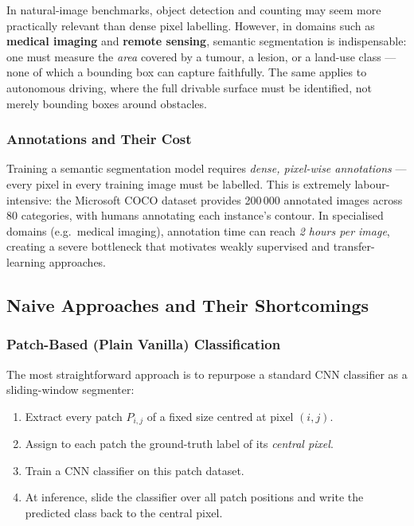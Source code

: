 \documentclass[11pt,a4paper]{article}
\begin{document}
In natural-image benchmarks, object detection and counting may seem more practically relevant than dense pixel labelling. However, in domains such as \textbf{medical imaging} and \textbf{remote sensing}, semantic segmentation is indispensable: one must measure the \emph{area} covered by a tumour, a lesion, or a land-use class — none of which a bounding box can capture faithfully. The same applies to autonomous driving, where the full drivable surface must be identified, not merely bounding boxes around obstacles.

\subsubsection{Annotations and Their Cost}

Training a semantic segmentation model requires \emph{dense, pixel-wise annotations} — every pixel in every training image must be labelled. This is extremely labour-intensive: the Microsoft COCO dataset provides 200\,000 annotated images across 80 categories, with humans annotating each instance's contour. In specialised domains (e.g.\ medical imaging), annotation time can reach \emph{2 hours per image}, creating a severe bottleneck that motivates weakly supervised and transfer-learning approaches.

\subsection{Naive Approaches and Their Shortcomings}
\label{sec:semseg_naive}

\subsubsection{Patch-Based (Plain Vanilla) Classification}

The most straightforward approach is to repurpose a standard CNN classifier as a sliding-window segmenter:

\begin{enumerate}
  \item Extract every patch $P_{i,j}$ of a fixed size centred at pixel $(i,j)$.
  \item Assign to each patch the ground-truth label of its \emph{central pixel}.
  \item Train a CNN classifier on this patch dataset.
  \item At inference, slide the classifier over all patch positions and write the predicted class back to the central pixel.
\end{enumerate}
\end{document}
